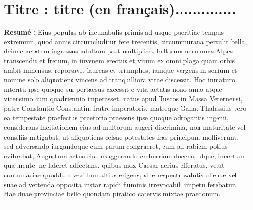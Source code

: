 \section*{\small\textcolor{mathSTIC-Color}{Titre :} titre (en fran\c cais)..............}
\vspace{-0.2cm}
\vspace{-0.2cm}
\begin{multicols}{2}
\begin{small}
\begin{spacing}{1}
\noindent \textbf{Resum\'{e} : }Eius populus ab incunabulis primis ad usque pueritiae tempus extremum, quod annis circumcluditur fere trecentis, circummurana pertulit bella, deinde aetatem ingressus adultam post multiplices bellorum aerumnas Alpes transcendit et fretum, in iuvenem erectus et virum ex omni plaga quam orbis ambit inmensus, reportavit laureas et triumphos, iamque vergens in senium et nomine solo aliquotiens vincens ad tranquilliora vitae discessit.
Hoc inmaturo interitu ipse quoque sui pertaesus excessit e vita aetatis nono anno atque vicensimo cum quadriennio imperasset. natus apud Tuscos in Massa Veternensi, patre Constantio Constantini fratre imperatoris, matreque Galla.
Thalassius vero ea tempestate praefectus praetorio praesens ipse quoque adrogantis ingenii, considerans incitationem eius ad multorum augeri discrimina, non maturitate vel consiliis mitigabat, ut aliquotiens celsae potestates iras principum molliverunt, sed adversando iurgandoque cum parum congrueret, eum ad rabiem potius evibrabat, Augustum actus eius exaggerando creberrime
docens, idque, incertum qua mente, ne lateret adfectans. quibus mox Caesar acrius efferatus, velut contumaciae quoddam vexillum altius erigens, sine respectu salutis alienae vel suae ad vertenda opposita instar rapidi fluminis irrevocabili impetu ferebatur.
Hae duae provinciae bello quondam piratico catervis mixtae praedonum.
\end{spacing}
\end{small}
\end{multicols}



\vspace{0.5cm}
{\centering \noindent \textcolor{mathSTIC-Color}{\rule{\textwidth}{0.2cm}}}
\vspace{-1cm}
